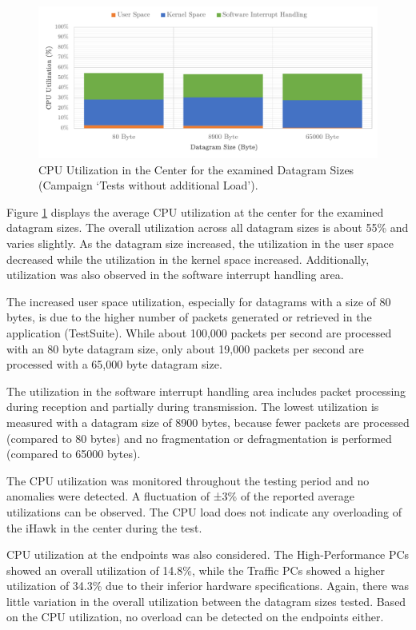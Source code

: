\begin{figure}[h!]
    \centering
    \includegraphics[width=1\linewidth]{figures/reliability/ihawk/diagr2.pdf}
    \caption{CPU Utilization in the Center for the examined Datagram Sizes (Campaign `Tests without additional Load').}
    \label{fig:diagr2CPU}
\end{figure}

Figure \ref{fig:diagr2CPU} displays the average CPU utilization at the center for the examined datagram sizes. The overall utilization across all datagram sizes is about 55\% and varies slightly. As the datagram size increased, the utilization in the user space decreased while the utilization in the kernel space increased. Additionally, utilization was also observed in the software interrupt handling area.

The increased user space utilization, especially for datagrams with a size of 80 bytes, is due to the higher number of packets generated or retrieved in the application (TestSuite). While about 100,000 packets per second are processed with an 80 byte datagram size, only about 19,000 packets per second are processed with a 65,000 byte datagram size.

The utilization in the software interrupt handling area includes packet processing during reception and partially during transmission. The lowest utilization is measured with a datagram size of 8900 bytes, because fewer packets are processed (compared to 80 bytes) and no fragmentation or defragmentation is performed (compared to 65000 bytes).

The CPU utilization was monitored throughout the testing period and no anomalies were detected. A fluctuation of ±3\% of the reported average utilizations can be observed. The CPU load does not indicate any overloading of the iHawk in the center during the test.

CPU utilization at the endpoints was also considered. The High-Performance PCs showed an overall utilization of 14.8\%, while the Traffic PCs showed a higher utilization of 34.3\% due to their inferior hardware specifications. Again, there was little variation in the overall utilization between the datagram sizes tested. Based on the CPU utilization, no overload can be detected on the endpoints either.

